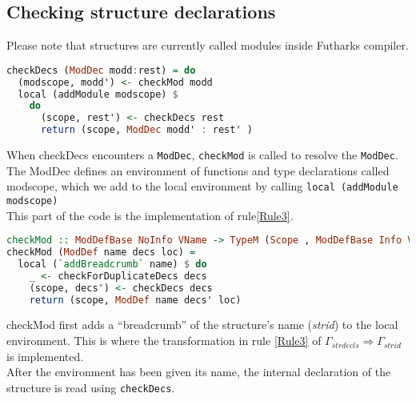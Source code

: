 \subsection{Checking structure declarations}\label{checkingstructuredeclarations}
Please note that structures are currently called modules inside Futharks compiler.
\begin{lstlisting}[language=Haskell]
checkDecs (ModDec modd:rest) = do
  (modscope, modd') <- checkMod modd
  local (addModule modscope) $
    do
      (scope, rest') <- checkDecs rest
      return (scope, ModDec modd' : rest' )
\end{lstlisting}
When checkDecs encounters a \texttt{ModDec}, \texttt{checkMod} is called to resolve the \texttt{ModDec}.
The ModDec defines an environment of functions and type declarations called
modscope, which we add to the local environment by calling \texttt{local
  (addModule modscope)}\\
This part of the code is the implementation of rule\ref{Rule3}.
\begin{lstlisting}[language=Haskell]
checkMod :: ModDefBase NoInfo VName -> TypeM (Scope , ModDefBase Info VName)
checkMod (ModDef name decs loc) =
  local (`addBreadcrumb` name) $ do
    _ <- checkForDuplicateDecs decs
    (scope, decs') <- checkDecs decs
    return (scope, ModDef name decs' loc)
\end{lstlisting}
checkMod first adds a ``breadcrumb'' of the structure's name (\textit{strid}) to
the local environment. This is where the transformation in rule \ref{Rule3} of
$\Gamma_{strdecls} \Rightarrow \Gamma_{strid}$ is implemented.
\\
After the environment has been given its name, the internal declaration of the
structure is read using \texttt{checkDecs}.
\\
